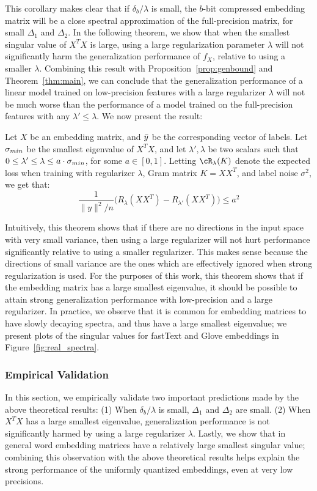 This corollary makes clear that if $\delta_b/\lambda$ is small, the $b$-bit compressed embedding matrix will be a close spectral approximation of the full-precision matrix, for small $\Delta_1$ and $\Delta_2$.
In the following theorem, we show that when the smallest singular value of $X^TX$ is large, using a large regularization parameter $\lambda$ will not significantly harm the generalization performance of $f_X$, relative to using a smaller $\lambda$.
Combining this result with Proposition~\ref{prop:genbound} and Theorem~\ref{thm:main}, we can conclude that the generalization performance of a linear model trained on low-precision features with a large regularizer $\lambda$ will not be much worse than the performance of a model trained on the full-precision features with any $\lambda' \leq \lambda$.
We now present the result:

\begin{theorem}
	\label{thm:large_lambda}
	Let $X$ be an embedding matrix, and $\by$ be the corresponding vector of labels. Let $\sm$ be the smallest eigenvalue of $X^T X$, and let $\lambda', \lambda$ be two scalars such that $0 \leq \lambda' \leq \lambda \leq a\cdot \sm$, for some $a \in [0,1]$. Letting $\cR_{\lambda}(K)$ denote the expected loss when training with regularizer $\lambda$, Gram matrix $K = XX^T$, and label noise $\sigma^2$, we get that:
	\begin{equation}
	\frac{1}{\|y\|^2/n}\Big(R_{\lambda}(XX^T) - R_{\lambda'}(XX^T)\Big) \leq a^2
	\label{eq1}
	\end{equation}
\end{theorem}
Intuitively, this theorem shows that if there are no directions in the input space with very small variance, then using a large regularizer will not hurt performance significantly relative to using a smaller regularizer.
This makes sense because the directions of small variance are the ones which are effectively ignored when strong regularization is used.
For the purposes of this work, this theorem shows that if the embedding matrix has a large smallest eigenvalue, it should be possible to attain strong generalization performance with low-precision and a large regularizer.
In practice, we observe that it is common for embedding matrices to have slowly decaying spectra, and thus have a large smallest eigenvalue;
we present plots of the singular values for fastText and Glove embeddings in Figure~\ref{fig:real_spectra}.

\subsubsection{Empirical Validation}
\label{sec:theory_validation}
In this section, we empirically validate two important predictions made by the above theoretical results: (1) When $\delta_b/\lambda$ is small, $\Delta_1$ and $\Delta_2$ are small. (2) When $X^T X$ has a large smallest eigenvalue, generalization performance is not significantly harmed by using a large regularizer $\lambda$.
Lastly, we show that in general word embedding matrices have a relatively large smallest singular value;
combining this observation with the above theoretical results helps explain the strong performance of the uniformly quantized embeddings, even at very low precisions.

